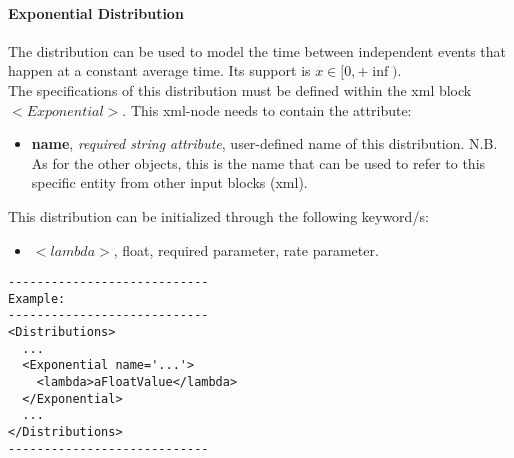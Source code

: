 \paragraph{Exponential Distribution}
\label{Exponential}
The  distribution can be used to model the time between independent events that
happen at a constant average time.  Its support is $x \in [0, +\inf)$.
\\ The specifications of this distribution must be defined within the xml block $<Exponential>$. This xml-node needs to contain the attribute:
\vspace{-5mm}
\begin{itemize}
\itemsep0em
\item \textbf{name}, \textit{required string attribute}, user-defined name of this distribution. N.B. As for the other objects, this is the name that can be used to refer to this specific entity from other input blocks (xml).   
\end{itemize}
\vspace{-5mm}
This distribution can be initialized through the following keyword/s:
\begin{itemize}
\item $<lambda>$, float, required parameter,  rate parameter.
\end{itemize}

\begin{lstlisting}[style=XML]
----------------------------
Example:
----------------------------
<Distributions>
  ...
  <Exponential name='...'>
    <lambda>aFloatValue</lambda>
  </Exponential>
  ...
</Distributions>
----------------------------
\end{lstlisting}

